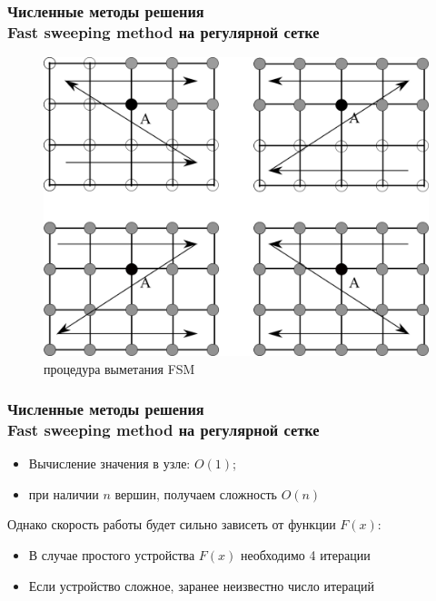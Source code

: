 \documentclass[hyperref={unicode=true},professionalfont]{beamer}
\newcommand{\stamp}{
	\begin{frame}[plain,noframenumbering]
		\begin{table}[h!]
			\flushright
			\vspace{5cm}
			\begin{adjustbox}{max width=0.7\textwidth}
				\begin{tabular}{
					|>{\footnotesize}p{0.8cm}|
					>{\footnotesize}p{0.8cm}|
					>{\footnotesize}p{2.2cm}|
					>{\footnotesize}p{1.1cm}|
					>{\footnotesize}p{0.8cm}|
					>{\footnotesize}p{5cm}|
					>{\footnotesize}p{0.1cm}|
					>{\footnotesize}p{0.1cm}|
					>{\footnotesize}p{0.1cm}|
					>{\footnotesize}p{0.8cm}|
					>{\footnotesize}p{1.4cm}|
				}
					\hline
					&&&&& \multicolumn{6}{>{\footnotesize}c|}{\multirow{3}{*}{\Large 0.043.00.00 ПЗ}} \\ \cline{1-5}
					&&&&& \multicolumn{6}{>{\footnotesize}c|}{} \\ \cline{1-5}
					Изм. & Лист & № Документа & Подпись & Дата & \multicolumn{6}{>{\footnotesize}c|}{} \\ \hline
					\multicolumn{2}{|>{\footnotesize}l|}{Разработал}
                    & Апанович Д.В. &  &  &
                                            \multirow{4}{5cm}{\centering
                                            Параллельный алгоритм
                                            численного решения
                                            анизотропного уравнения эйконала} & \multicolumn{3}{>{\footnotesize}l|}{Лит.} & Лист & Листов \\ \cline{1-5}\cline{7-11}
					\multicolumn{2}{|>{\footnotesize}l|}{Проверил}
                    & Казаков А.Л. &  &  &  & У & & & \insertframenumber & \inserttotalframenumber \\ \cline{1-5}\cline{7-11}
					\multicolumn{2}{|>{\footnotesize}l|}{Нормоконтролер}
                    & Казаков А.Л. &  &  &  & \multicolumn{5}{>{\footnotesize}l|}{} \\ \cline{1-5}
					\multicolumn{2}{|>{\footnotesize}l|}{} &  &  &  &  & \multicolumn{5}{>{\footnotesize}l|}{Кафедра АС, гр. ИСТм-16-1} \\ \cline{1-5}
					\multicolumn{2}{|>{\footnotesize}l|}{Утвердил}
                    & Бахвалов С.В. &  &  &  & \multicolumn{5}{>{\footnotesize}l|}{} \\ \hline

				\end{tabular}
			\end{adjustbox}
		\end{table}

	\end{frame}
}
\renewcommand{\stamp}{}
\begin{document}
\begin{frame}
  \frametitle{Численные методы решения \\ Fast sweeping method на
    регулярной сетке}
  \begin{figure}[ht]
  \centering
  \includegraphics[width=0.7\linewidth]{fsm_expand.png}
  \hfil \caption{процедура выметания FSM}
  \label{fig:eikvis}

\end{figure}
\end{frame}
\stamp

\begin{frame}
  \frametitle{Численные методы решения \\ Fast sweeping method на
    регулярной сетке}

  \begin{itemize}
  \item Вычисление значения в узле: $O(1)$;
  \item при наличии $n$ вершин, получаем сложность $O(n)$
  \end{itemize}
  \vspace{1em}
  Однако скорость работы будет сильно зависеть от функции $F(x)$:
  \begin{itemize}
  \item В случае простого устройства $F(x)$ необходимо 4 итерации
  \item Если устройство сложное, заранее неизвестно число итераций
  \end{itemize}
  
  
  
\end{frame}
\stamp
\end{document}
